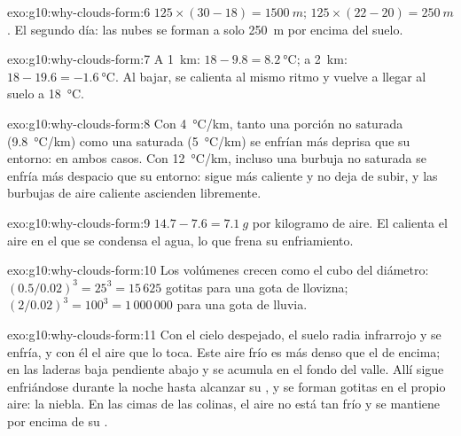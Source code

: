\begin{solution}{exo:g10:why-clouds-form:6}
$125 \times (30 - 18) = \qty{1500}{m}$; $125 \times (22 - 20) =
\qty{250}{m}$. El segundo día: las nubes se forman a solo \qty{250}{m} por
encima del suelo.
\end{solution}

\begin{solution}{exo:g10:why-clouds-form:7}
A \qty{1}{km}: $18 - 9.8 = \qty{8.2}{\degreeCelsius}$; a \qty{2}{km}:
$18 - 19.6 = \qty{-1.6}{\degreeCelsius}$. Al bajar, se calienta al mismo
ritmo y vuelve a llegar al suelo a \qty{18}{\degreeCelsius}.
\end{solution}

\begin{solution}{exo:g10:why-clouds-form:8}
Con \qty{4}{\degreeCelsius/km}, tanto una porción no saturada
(\qty{9.8}{\degreeCelsius/km}) como una saturada
(\qty{5}{\degreeCelsius/km}) se enfrían más deprisa que su entorno: 
en ambos casos. Con \qty{12}{\degreeCelsius/km}, incluso una burbuja no
saturada se enfría más despacio que su entorno: sigue más caliente y no deja
de subir, y las burbujas de aire caliente ascienden libremente.
\end{solution}

\begin{solution}{exo:g10:why-clouds-form:9}
$14.7 - 7.6 = \qty{7.1}{g}$ por kilogramo de aire. El  calienta
el aire en el que se condensa el agua, lo que frena su enfriamiento.
\end{solution}

\begin{solution}{exo:g10:why-clouds-form:10}
Los volúmenes crecen como el cubo del diámetro: $(0.5/0.02)^3 = 25^3 = 15\,625$
gotitas para una gota de llovizna; $(2/0.02)^3 = 100^3 = 1\,000\,000$ para
una gota de lluvia.
\end{solution}

\begin{solution}{exo:g10:why-clouds-form:11}
Con el cielo despejado, el suelo radia infrarrojo y se enfría, y con él el
aire que lo toca. Este aire frío es más denso que el de encima; en las
laderas baja pendiente abajo y se acumula en el fondo del valle. Allí sigue
enfriándose durante la noche hasta alcanzar su , y se forman
gotitas en el propio aire: la niebla. En las cimas de las colinas, el aire
no está tan frío y se mantiene por encima de su .
\end{solution}

